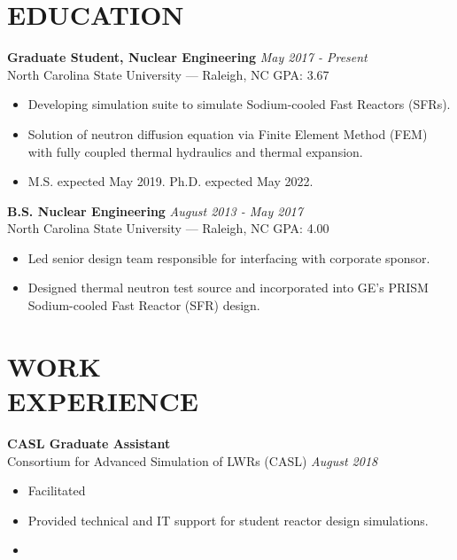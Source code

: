 \documentclass[margin, 10pt]{res}
\newcommand{\backwardspace}{-8pt}
\begin{document}
\begin{resume}


\vspace{-12pt}
 
\section{EDUCATION}  
\textbf{Graduate Student, Nuclear Engineering} \hfill 
  \textit{May 2017 - Present}\\
North Carolina State University --- Raleigh, NC \hfill GPA: 3.67
\begin{itemize}
    \item Developing simulation suite to simulate Sodium-cooled Fast Reactors 
      (SFRs).
    \item Solution of neutron diffusion equation via Finite Element Method (FEM)
      with fully coupled thermal hydraulics and thermal expansion.
    \item M.S. expected May 2019. Ph.D. expected May 2022.
\end{itemize}
\vspace{\backwardspace}
\textbf{B.S. Nuclear Engineering} \hfill \textit{August 2013 - May 2017} \\
North Carolina State University --- Raleigh, NC \hfill GPA: 4.00
\begin{itemize}
    \item Led senior design team responsible for interfacing with corporate 
      sponsor.
    \item Designed thermal neutron test source and incorporated into GE's PRISM 
      Sodium-cooled Fast Reactor (SFR) design.
\end{itemize}

 
\section{WORK \\ EXPERIENCE}

\textbf{CASL Graduate Assistant}\\
Consortium for Advanced Simulation of LWRs (CASL) \hfill \textit{August 2018}
\begin{itemize}
    \item Facilitated 
    \item Provided technical and IT support for student reactor design 
      simulations.
    \item 
\end{itemize}


\end{resume}
\end{document}
